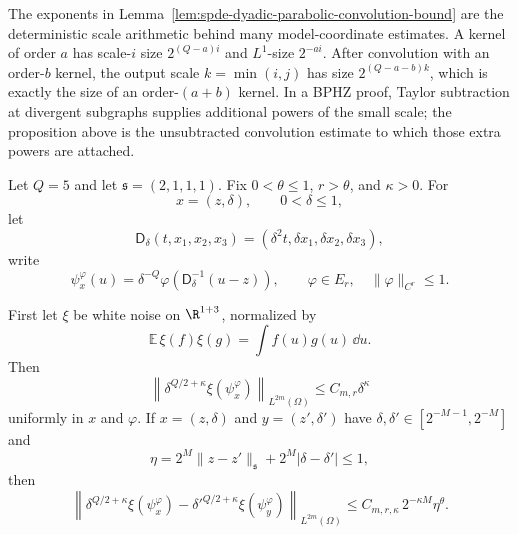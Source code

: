 The exponents in
Lemma~\ref{lem:spde-dyadic-parabolic-convolution-bound} are the
deterministic scale arithmetic behind many model-coordinate estimates.  A
kernel of order \(a\) has scale-\(i\) size \(2^{(Q-a)i}\) and \(L^1\)-size
\(2^{-ai}\).  After convolution with an order-\(b\) kernel, the output scale
\(k=\min(i,j)\) has size \(2^{(Q-a-b)k}\), which is exactly the size of an
order-\((a+b)\) kernel.  In a BPHZ proof, Taylor subtraction at divergent
subgraphs supplies additional powers of the small scale; the proposition
above is the unsubtracted convolution estimate to which those extra powers
are attached.

\begin{proposition}
\label{prop:spde-gaussian-wick-coordinate-scale-estimates}
Let \(Q=5\) and let \(\mathfrak s=(2,1,1,1)\).  Fix
\(0<\theta\leq1\), \(r>\theta\), and \(\kappa>0\).  For
\[
  x=(z,\delta),\qquad 0<\delta\leq1,
\]
let
\[
  \mathsf D_\delta(t,x_1,x_2,x_3)
  =
  (\delta^2t,\delta x_1,\delta x_2,\delta x_3),
\]
write
\begin{equation}
  \psi_x^\varphi(u)
  =
  \delta^{-Q}\varphi(\mathsf D_{\delta}^{-1}(u-z)),
  \qquad
  \varphi\in E_r,\quad \|\varphi\|_{C^r}\leq1 .
  \label{eq:spde-gaussian-test-kernel}
\end{equation}

First let \(\xi\) be white noise on \(\R^{1+3}\), normalized by
\[
  \mathbb E\,\xi(f)\xi(g)=\int f(u)g(u)\,\dd u .
\]
Then
\begin{equation}
  \left\|
    \delta^{Q/2+\kappa}\xi(\psi_x^\varphi)
  \right\|_{L^{2m}(\Omega)}
  \leq
  C_{m,r}\delta^\kappa
  \label{eq:spde-white-noise-coordinate-scale}
\end{equation}
uniformly in \(x\) and \(\varphi\).  If \(x=(z,\delta)\) and
\(y=(z',\delta')\) have \(\delta,\delta'\in[2^{-M-1},2^{-M}]\) and
\[
  \eta=
  2^M\|z-z'\|_{\mathfrak s}+2^M|\delta-\delta'|
  \leq1 ,
\]
then
\begin{equation}
  \left\|
    \delta^{Q/2+\kappa}\xi(\psi_x^\varphi)
    -
    {\delta'}^{Q/2+\kappa}\xi(\psi_y^\varphi)
  \right\|_{L^{2m}(\Omega)}
  \leq
  C_{m,r,\kappa}\,2^{-\kappa M}\eta^\theta .
  \label{eq:spde-white-noise-coordinate-edge}
\end{equation}


\end{proposition}
